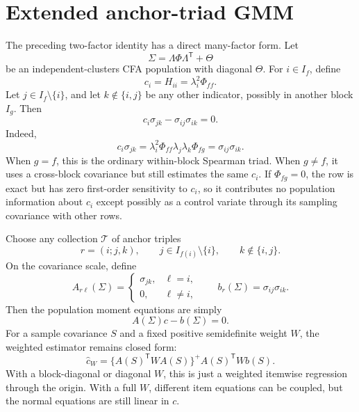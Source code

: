 \documentclass[11pt]{article}
\newcommand{\T}{^{\mathsf T}}
\theoremstyle{plain}
\theoremstyle{remark}
\begin{document}
\section{Extended anchor-triad GMM}

The preceding two-factor identity has a direct many-factor form. Let
\[
  \Sigma=\Lambda\Phi\Lambda\T+\Theta
\]
be an independent-clusters CFA population with diagonal \(\Theta\). For
\(i\in I_f\), define
\[
  c_i=H_{ii}=\lambda_i^2\Phi_{ff}.
\]
Let \(j\in I_f\setminus\{i\}\), and let \(k\notin\{i,j\}\) be any other
indicator, possibly in another block \(I_g\). Then
\begin{equation}\label{eq:anchor-triad}
  c_i\sigma_{jk}-\sigma_{ij}\sigma_{ik}=0 .
\end{equation}
Indeed,
\[
  c_i\sigma_{jk}
  =
  \lambda_i^2\Phi_{ff}\lambda_j\lambda_k\Phi_{fg}
  =
  \sigma_{ij}\sigma_{ik}.
\]
When \(g=f\), this is the ordinary within-block Spearman triad. When \(g\ne f\),
it uses a cross-block covariance but still estimates the same \(c_i\). If
\(\Phi_{fg}=0\), the row is exact but has zero first-order sensitivity to
\(c_i\), so it contributes no population information about \(c_i\) except
possibly as a control variate through its sampling covariance with other rows.

Choose any collection \(\mathcal T\) of anchor triples
\[
  r=(i;j,k),
  \qquad
  j\in I_{f(i)}\setminus\{i\},
  \qquad
  k\notin\{i,j\}.
\]
On the covariance scale, define
\[
  A_{r\ell}(\Sigma)
  =
  \begin{cases}
    \sigma_{jk}, & \ell=i,\\
    0,           & \ell\ne i,
  \end{cases}
  \qquad
  b_r(\Sigma)=\sigma_{ij}\sigma_{ik}.
\]
Then the population moment equations are simply
\[
  A(\Sigma)c-b(\Sigma)=0 .
\]
For a sample covariance \(S\) and a fixed positive semidefinite weight \(W\),
the weighted estimator remains closed form:
\begin{equation}\label{eq:extended-anchor-solve}
  \hat c_W
  =
  \{A(S)\T W A(S)\}^{+}A(S)\T W b(S).
\end{equation}
With a block-diagonal or diagonal \(W\), this is just a weighted itemwise
regression through the origin. With a full \(W\), different item equations can
be coupled, but the normal equations are still linear in \(c\).
\end{document}
